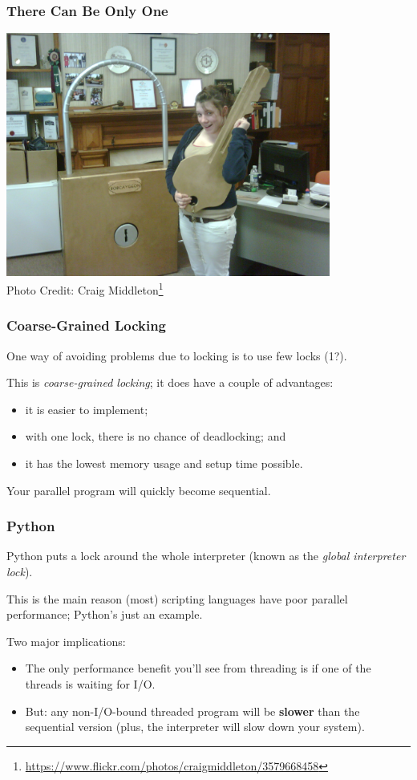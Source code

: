 \begin{frame}
\frametitle{There Can Be Only One}

\begin{center}
	\includegraphics[width=0.8\textwidth]{images/giantlock.jpg}\\
	\hfill Photo Credit: Craig Middleton\footnote{\url{https://www.flickr.com/photos/craigmiddleton/3579668458}}
\end{center}


\end{frame}


\begin{frame}
\frametitle{Coarse-Grained Locking}

One way of avoiding problems due to locking is to use few locks
(1?). 

This is \emph{coarse-grained locking}; it does have a couple of advantages:
  \begin{itemize}
    \item it is easier to implement;
    \item with one lock, there is no chance of deadlocking; and
    \item it has the lowest memory usage and setup time possible.
  \end{itemize}

Your parallel program will quickly become sequential.


\end{frame}

\begin{frame}
\frametitle{Python}

Python puts a lock around the whole interpreter (known as the
\emph{global interpreter lock}).  

This is the main reason (most) scripting languages have poor parallel performance; Python's just an example.

Two major implications:
\begin{itemize}
\item The only performance benefit you'll see from threading is if one of the threads is
      waiting for I/O.
\item But: any non-I/O-bound threaded program will be {\bf slower} than the sequential
      version (plus, the interpreter will slow down your system).
\end{itemize}


\end{frame}

